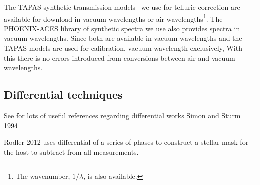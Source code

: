 The {TAPAS} synthetic transmission models~\citet{bertaux_tapas_2014} we use for telluric correction are available for download in vacuum wavelengths or air wavelengths\footnote{The wavenumber, \(1/\lambda\), is also available.}. The {PHOENIX-ACES} library of synthetic spectra we use also provides spectra in vacuum wavelengths.
Since both are available in vacuum wavelengths and the {TAPAS} models are used for calibration, vacuum wavelength exclusively, With this there is no errors introduced from conversions between air and vacuum wavelengths.


\subsection{Differential techniques}
See  \citet{kostov... 2013} for lots of useful references regarding differential works Simon and Sturm 1994

Rodler 2012  uses differential of a series of phases to construct a stellar mask for the host to subtract from all measurements.

